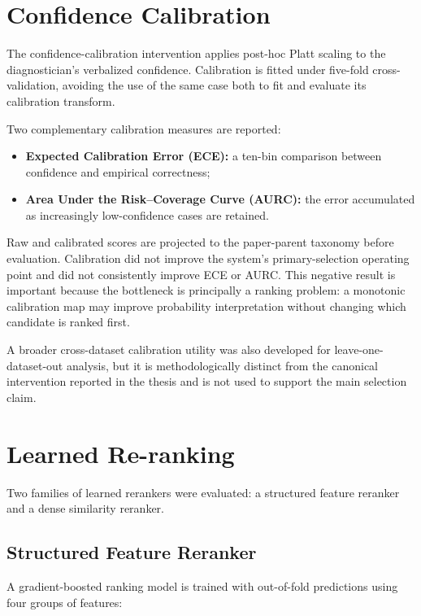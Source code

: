 \section{Confidence Calibration}
\label{app:calibration}

The confidence-calibration intervention applies post-hoc Platt scaling to the
diagnostician's verbalized confidence. Calibration is fitted under five-fold
cross-validation, avoiding the use of the same case both to fit and evaluate
its calibration transform.

Two complementary calibration measures are reported:

\begin{itemize}
  \item \textbf{Expected Calibration Error (ECE):} a ten-bin comparison
        between confidence and empirical correctness;
  \item \textbf{Area Under the Risk--Coverage Curve (AURC):} the error
        accumulated as increasingly low-confidence cases are retained.
\end{itemize}

Raw and calibrated scores are projected to the paper-parent taxonomy before
evaluation. Calibration did not improve the system's primary-selection
operating point and did not consistently improve ECE or AURC. This negative
result is important because the bottleneck is principally a ranking problem:
a monotonic calibration map may improve probability interpretation without
changing which candidate is ranked first.

A broader cross-dataset calibration utility was also developed for
leave-one-dataset-out analysis, but it is methodologically distinct from the
canonical intervention reported in the thesis and is not used to support the
main selection claim.

\section{Learned Re-ranking}
\label{app:ranker}

Two families of learned rerankers were evaluated: a structured feature
reranker and a dense similarity reranker.

\subsection{Structured Feature Reranker}

A gradient-boosted ranking model is trained with out-of-fold predictions using
four groups of features:


